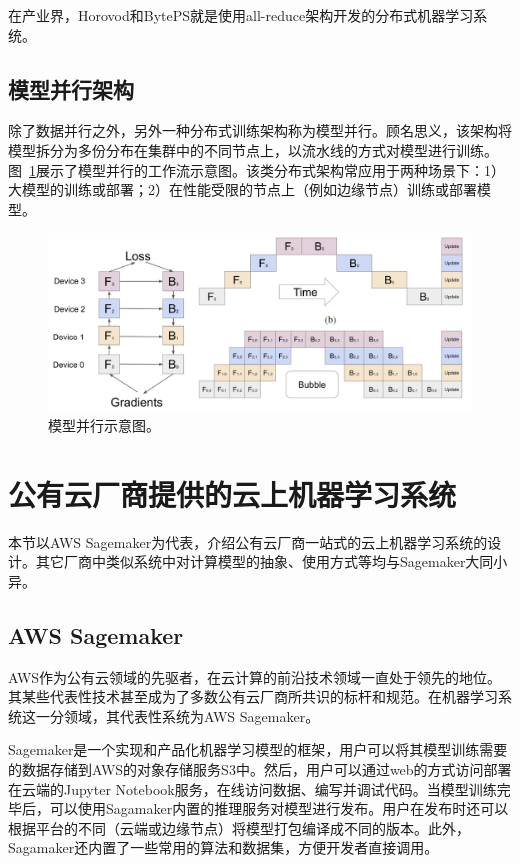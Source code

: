 在产业界，Horovod\parencite{sergeev2018horovod}和BytePS\parencite{jiang2020a}就是使用all-reduce架构开发的分布式机器学习系统。

\subsection{模型并行架构}

除了数据并行之外，另外一种分布式训练架构称为模型并行\parencite{jia2018data,huang2019gpipe}。顾名思义，该架构将模型拆分为多份分布在集群中的不同节点上，以流水线的方式对模型进行训练。图~\ref{model_para}展示了模型并行的工作流示意图。该类分布式架构常应用于两种场景下：1）大模型的训练或部署；2）在性能受限的节点上（例如边缘节点）训练或部署模型。

\begin{figure}[h]
    \centerline{\includegraphics[width=\textwidth]{figures/gpipe-workflow.png}}
    \caption{模型并行示意图。}
    \label{model_para}
\end{figure}

\section{公有云厂商提供的云上机器学习系统}

本节以AWS Sagemaker为代表，介绍公有云厂商一站式的云上机器学习系统的设计。其它厂商中类似系统中对计算模型的抽象、使用方式等均与Sagemaker大同小异。

\subsection{AWS Sagemaker}\label{subsec_sagemaker}
AWS作为公有云领域的先驱者，在云计算的前沿技术领域一直处于领先的地位。其某些代表性技术甚至成为了多数公有云厂商所共识的标杆和规范。在机器学习系统这一分领域，其代表性系统为AWS Sagemaker。

Sagemaker是一个实现和产品化机器学习模型的框架\parencite{joshi2020amazon}，用户可以将其模型训练需要的数据存储到AWS的对象存储服务S3中。然后，用户可以通过web的方式访问部署在云端的Jupyter Notebook服务，在线访问数据、编写并调试代码。当模型训练完毕后，可以使用Sagamaker内置的推理服务对模型进行发布。用户在发布时还可以根据平台的不同（云端或边缘节点）将模型打包编译成不同的版本。此外，Sagamaker还内置了一些常用的算法和数据集，方便开发者直接调用。

